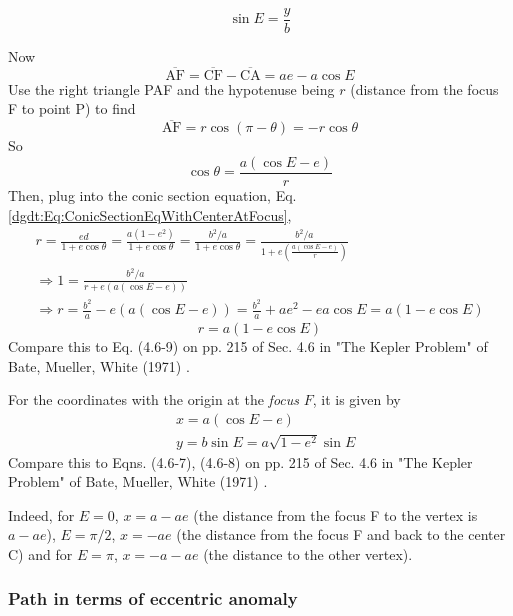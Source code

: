 \begin{equation}
\sin{E} = \frac{y}{b}
\end{equation}

Now
\[
\overline{\text{AF}} = \overline{\text{CF}} - \overline{\text{CA}} = ae - a\cos{E}
\]
Use the right triangle PAF and the hypotenuse being $r$ (distance from the focus F to point P) to find
\[
\overline{\text{AF}} = r\cos{(\pi - \theta)} = -r\cos{\theta}
\]
So
\[
\cos{\theta} = \frac{ a ( \cos{E} - e) }{r} 
\]
Then, plug into the conic section equation, Eq. \ref{dgdt:Eq:ConicSectionEqWithCenterAtFocus}, 
\[
\begin{gathered}
	r = \frac{ed}{ 1 + e\cos{\theta}} = \frac{ a (1-e^2) }{ 1 + e\cos{\theta}} = \frac{b^2 /a}{ 1 + e\cos{\theta}} = \frac{b^2/a}{ 1 + e\left( \frac{ a(\cos{E} - e) }{ r} \right) } \\
		\Longrightarrow 1 = \frac{ b^2 / a}{ r + e(a(\cos{E} - e))} \\
		\Longrightarrow r = \frac{b^2}{a} - e(a(\cos{E} - e)) = \frac{b^2}{a} + ae^2 - ea \cos{E} = a(1 - e \cos{E})
\end{gathered}
\]
\begin{equation}\label{dgdt:Eq:EllipseEquationWithEccentricAnomaly}
\boxed{ r = a(1 - e\cos{E}) }
\end{equation}
Compare this to Eq. (4.6-9) on pp. 215 of Sec. 4.6 in "The Kepler Problem" of Bate, Mueller, White (1971) \cite{dgdt:BMW1971}.

For the coordinates with the origin at the \emph{focus} $F$, it is given by 
\begin{equation}\label{dgdt:Eq:EllipticalPathInEccentricAnomaly}
\begin{aligned}
& x = a(\cos{E} - e) \\
& y = b\sin{E} = a\sqrt{ 1 - e^2} \sin{E}
\end{aligned}
\end{equation}
Compare this to Eqns. (4.6-7), (4.6-8) on pp. 215 of Sec. 4.6 in "The Kepler Problem" of Bate, Mueller, White (1971) \cite{dgdt:BMW1971}.

Indeed, for $E=0$, $x = a - ae$ (the distance from the focus F to the vertex is $a - ae$), $E = \pi/2$, $x =-ae$ (the distance from the focus F and back to the center C) and for $E = \pi$, $x = -a - ae$ (the distance to the other vertex).

\subsubsection{Path in terms of eccentric anomaly}

